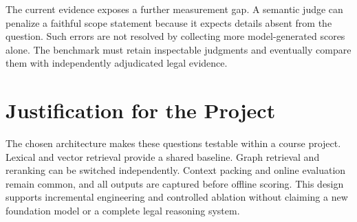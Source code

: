 The current evidence exposes a further measurement gap. A semantic judge can penalize a faithful scope statement because it expects details absent from the question. Such errors are not resolved by collecting more model-generated scores alone. The benchmark must retain inspectable judgments and eventually compare them with independently adjudicated legal evidence.

\section{Justification for the Project}
The chosen architecture makes these questions testable within a course project. Lexical and vector retrieval provide a shared baseline. Graph retrieval and reranking can be switched independently. Context packing and online evaluation remain common, and all outputs are captured before offline scoring. This design supports incremental engineering and controlled ablation without claiming a new foundation model or a complete legal reasoning system.
